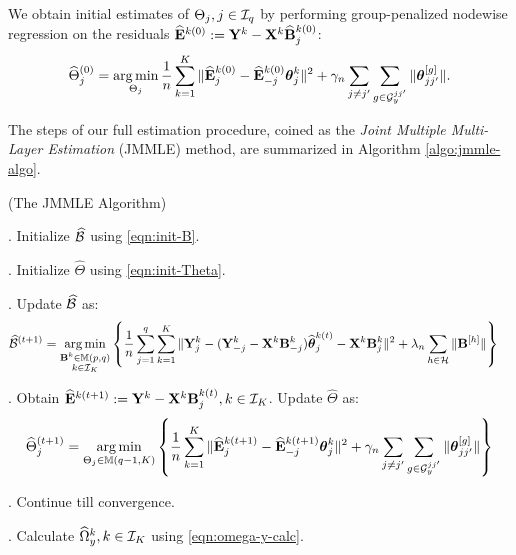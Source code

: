 We obtain initial estimates of $ \Theta_j, j \in {\cal{I}}_q$ by performing group-penalized nodewise regression on the residuals $\widehat {{\mathbf{E}}}^{k (0)} := {\mathbf{Y}}^k - {\mathbf{X}}^k \widehat {{\mathbf{B}}}_j^{k (0)}$:
%
\begin{align}\label{eqn:init-Theta}
\widehat \Theta_j^{(0)} = \operatorname*{arg\,min}_{\Theta_j} \frac{1}{n} \sum_{k=1}^K \|
\widehat {{\mathbf{E}}}_j^{k (0)} - \widehat {{\mathbf{E}}}_{-j}^{k (0)} {\boldsymbol{\theta}}_j^k \|^2
+ \gamma_n \sum_{j \neq j'} \sum_{g \in {\cal{G}}_y^{jj'}} \| {\boldsymbol{\theta}}_{jj'}^{[g]} \|.
\end{align}

The steps of our full estimation procedure, coined as the {\it Joint Multiple Multi-Layer Estimation} (JMMLE) method, are summarized in Algorithm \ref{algo:jmmle-algo}.

\begin{Algorithm}
(The JMMLE Algorithm)
\label{algo:jmmle-algo}

. Initialize $\widehat {{\cal{B}}}$ using \eqref{eqn:init-B}.

. Initialize $\widehat \Theta$ using \eqref{eqn:init-Theta}.

. Update $\widehat {{\cal{B}}}$ as:
%
\begin{align}\label{eqn:update-B}
\widehat {{\cal{B}}}^{(t+1)} &= \operatorname*{arg\,min}_{\substack{{\mathbf{B}}^k \in {\mathbb{M}}(p,q)\\k \in {\cal{I}}_K}} \left\{ \frac{1}{n} \sum_{j=1}^q \sum_{k=1}^K \| {\mathbf{Y}}^k_j - ({\mathbf{Y}}_{-j}^k - {\mathbf{X}}^k {\mathbf{B}}_{-j}^k) \widehat {{\boldsymbol{\theta}}}_j^{k (t)} - {\mathbf{X}}^k {\mathbf{B}}_j^{k } \|^2
+ \lambda_n \sum_{h \in {\cal{H}}} \| {\mathbf{B}}^{[h]} \| \right\}
\end{align}

. Obtain $\widehat {{\mathbf{E}}}^{k (t+1)} := {\mathbf{Y}}^k - {\mathbf{X}}^k {\mathbf{B}}_j^{k (t)}, k \in {\cal{I}}_K$. Update $\widehat \Theta$ as:
%
\begin{align}\label{eqn:update-Theta}
\widehat \Theta_j^{(t+1)} = \operatorname*{arg\,min}_{\Theta_j \in {\mathbb{M}}(q-1, K)}
\left\{ \frac{1}{n} \sum_{k=1}^K
\| \widehat {{\mathbf{E}}}_j^{k (t+1)} - \widehat {{\mathbf{E}}}_{-j}^{k (t+1)} {\boldsymbol{\theta}}_j^k \|^2
+ \gamma_n \sum_{j \neq j'} \sum_{g \in {\cal{G}}_y^{jj'}} \| {\boldsymbol{\theta}}_{jj'}^{[g]} \| \right\}
\end{align}

. Continue till convergence.

. Calculate $\widehat \Omega_y^k, k \in {\cal{I}}_K$ using \eqref{eqn:omega-y-calc}.
\end{Algorithm}

